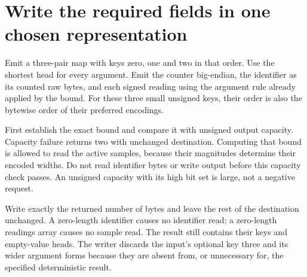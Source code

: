 \section{Write the required fields in one chosen representation}
Emit a three-pair map with keys zero, one and two in that order. Use the shortest head
for every argument. Emit the counter big-endian, the identifier as its counted raw
bytes, and each signed reading using the argument rule already applied by the bound.
For these three small unsigned keys, their order is also the bytewise order of their
preferred encodings.

First establish the exact bound and compare it with unsigned output capacity. Capacity
failure returns two with unchanged destination. Computing that bound is allowed to
read the active samples, because their magnitudes determine their encoded widths.
Do not read identifier bytes or write output before this capacity check passes. An
unsigned capacity with its high bit set is large, not a negative request.

Write exactly the returned number of bytes and leave the rest of the destination
unchanged. A zero-length identifier causes no identifier read; a zero-length readings
array causes no sample read. The result still contains their keys and empty-value heads.
The writer discards the input's optional key three and its wider argument forms because
they are absent from, or unnecessary for, the specified deterministic result.
